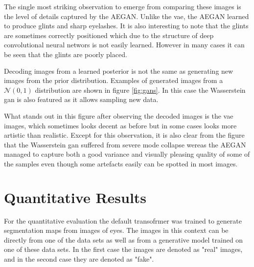 The single most striking observation to emerge from comparing these images is the level of details captured by the AEGAN. Unlike the \acrshort{vae}, the AEGAN learned to produce glints and sharp eyelashes. It is also interesting to note that the glints are sometimes correctly positioned which due to the structure of deep convolutional neural networs is not easily learned. However in many cases it can be seen that the glints are poorly placed.

Decoding images from a learned posterior is not the same as generating new images from the prior distribution. Examples of generated images from a $\mathcal{N}(0, 1)$ distribution are shown in figure \ref{fig:gans}. In this case the Wasserstein \acrshort{gan} is also featured as it allows sampling new data. 

What stands out in this figure after observing the decoded images is the \acrshort{vae} images, which sometimes looks decent as before but in some cases looks more artistic than realistic. Except for this observation, it is also clear from the figure that the Wasserstein \acrshort{gan} suffered from severe mode collapse wereas the AEGAN managed to capture both a good variance and visually pleasing quality of some of the samples even though some artefacts easily can be spotted in most images.



\section{Quantitative Results}
For the quantitative evaluation the default transofrmer was trained to generate segmentation maps from images of eyes. The images in this context can be directly from one of the data sets as well as from a generative model trained on one of these data sets. In the first case the images are denoted as "real" images, and in the second case they are denoted as "fake". 

